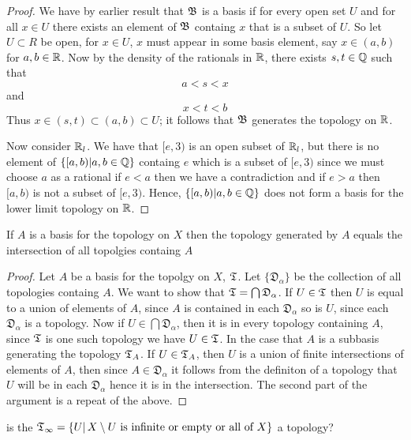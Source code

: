 \begin{proof}
    We have by earlier result that $\mathfrak{B}$ is a basis if for every open set $U$ and for all $x \in U$ there exists an element of $\mathfrak{B}$ 
    containg $x$ that is a subset of $U$. So let $U \subset R$ be open, for $x \in U$, $x$ must appear in some basis element, say $x \in (a, b)$ for $a, b \in \mathbb{R}$. Now by the density of the rationals in $\mathbb{R}$, there exists 
    $s, t \in \mathbb{Q}$ such that 
    \[a < s < x\]
    and 
    \[x < t < b\]
    Thus $x \in (s, t) \subset (a, b) \subset U$; it follows that $\mathfrak{B}$ generates the topology on $\mathbb{R}$. 

    Now consider $\mathbb{R}_l$. We have that $[e, 3)$ is an open subset of $\mathbb{R}_l$, but there is no element of $\{[a, b)| a, b \in \mathbb{Q}\}$ containg $e$ which is a subset 
    of $[e, 3)$ since we must choose $a$ as a rational if $e < a$ then we have a contradiction and if $e > a$ then $[a, b)$ is not a subset of $[e, 3)$. Hence, 
    $\{[a, b)| a, b \in \mathbb{Q}\}$ does not form a basis for the lower limit topology on $\mathbb{R}$.  
\end{proof}


\newpage
\question
If $A$ is a basis for the topology on $X$ then the topology generated by $A$ equals the intersection of all topolgies containg $A$ 


\begin{proof}
    Let $A$ be a basis for the topolgy on $X$, $\mathfrak{T}$. Let $\{ \mathfrak{D}_{\alpha} \}$ be the collection of all topologies containg $A$. 
    We want to show that $\mathfrak{T} = \bigcap \mathfrak{D}_\alpha$. If $U \in \mathfrak{T}$ then $U$ is equal to a union of elements of $A$, since
    $A$ is contained in each $\mathfrak{D}_\alpha$ so is $U$, since each $\mathfrak{D}_\alpha$ is a topology. Now if $U \in \bigcap \mathfrak{D}_\alpha$, 
    then it is in every topology containing $A$, since $\mathfrak{T}$ is one such topology we have $U \in \mathfrak{T}$.  In the case that $A$ is a subbasis generating 
    the topology $\mathfrak{T}_A$. If $U \in \mathfrak{T}_A$, then $U$ is a union of finite intersections of elements of $A$, then since $A \in \mathfrak{D}_\alpha$ it follows 
    from the definiton of a topology that $U$ will be in each $\mathfrak{D}_\alpha$ hence it is in the intersection. The second part of the argument is a repeat of the above. 

\end{proof}



\question 
is the $\mathfrak{T}_\infty = \{U |\, X \setminus U \text{ is infinite or empty or all of } X\}$ a topology?

